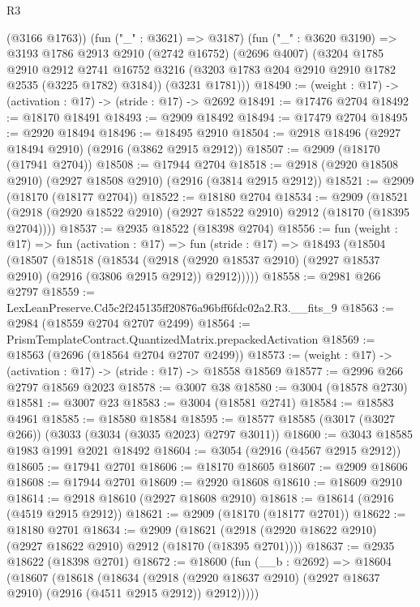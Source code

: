 \begin{lexlean}{R3}
\begin{coremodule}
        (@3166 @1763))
      (fun ("_" : @3621) => @3187)
      (fun ("_" : @3620 @3190) =>
      @3193
        @1786
        @2913
        @2910
        (@2742 @16752)
        (@2696 @4007)
        (@3204
          @1785
          @2910
          @2912
          @2741
          @16752
          @3216
          (@3203 @1783 @204 @2910 @2910 @1782 @2535 (@3225 @1782) @3184))
        (@3231 @1781)))
@18490 := (weight : @17) -> (activation : @17) -> (stride : @17) -> @2692
@18491 := @17476 @2704
@18492 := @18170 @18491
@18493 := @2909 @18492
@18494 := @17479 @2704
@18495 := @2920 @18494
@18496 := @18495 @2910
@18504 := @2918 @18496 (@2927 @18494 @2910) (@2916 (@3862 @2915 @2912))
@18507 := @2909 (@18170 (@17941 @2704))
@18508 := @17944 @2704
@18518 := @2918 (@2920 @18508 @2910) (@2927 @18508 @2910) (@2916 (@3814 @2915 @2912))
@18521 := @2909 (@18170 (@18177 @2704))
@18522 := @18180 @2704
@18534 := @2909
    (@18521 (@2918 (@2920 @18522 @2910) (@2927 @18522 @2910) @2912 (@18170 (@18395 @2704))))
@18537 := @2935 @18522 (@18398 @2704)
@18556 := fun (weight : @17) =>
  fun (activation : @17) =>
  fun (stride : @17) =>
  @18493
    (@18504
      (@18507
        (@18518
          (@18534
            (@2918 (@2920 @18537 @2910) (@2927 @18537 @2910) (@2916 (@3806 @2915 @2912)) @2912)))))
@18558 := @2981 @266 @2797
@18559 := LexLeanPreserve.Cd5c2f245135ff20876a96bff6fdc02a2.R3.__fits_9
@18563 := @2984 (@18559 @2704 @2707 @2499)
@18564 := PrismTemplateContract.QuantizedMatrix.prepackedActivation
@18569 := @18563 (@2696 (@18564 @2704 @2707 @2499))
@18573 := (weight : @17) -> (activation : @17) -> (stride : @17) -> @18558 @18569
@18577 := @2996 @266 @2797 @18569 @2023
@18578 := @3007 @38
@18580 := @3004 (@18578 @2730)
@18581 := @3007 @23
@18583 := @3004 (@18581 @2741)
@18584 := @18583 @4961
@18585 := @18580 @18584
@18595 := @18577 @18585 (@3017 (@3027 @266)) (@3033 (@3034 (@3035 @2023) @2797 @3011))
@18600 := @3043 @18585 @1983 @1991 @2021 @18492
@18604 := @3054 (@2916 (@4567 @2915 @2912))
@18605 := @17941 @2701
@18606 := @18170 @18605
@18607 := @2909 @18606
@18608 := @17944 @2701
@18609 := @2920 @18608
@18610 := @18609 @2910
@18614 := @2918 @18610 (@2927 @18608 @2910)
@18618 := @18614 (@2916 (@4519 @2915 @2912))
@18621 := @2909 (@18170 (@18177 @2701))
@18622 := @18180 @2701
@18634 := @2909
    (@18621 (@2918 (@2920 @18622 @2910) (@2927 @18622 @2910) @2912 (@18170 (@18395 @2701))))
@18637 := @2935 @18622 (@18398 @2701)
@18672 := @18600
    (fun (__b : @2692) =>
    @18604
      (@18607
        (@18618
          (@18634
            (@2918 (@2920 @18637 @2910) (@2927 @18637 @2910) (@2916 (@4511 @2915 @2912)) @2912)))))

\end{coremodule}
\end{lexlean}
